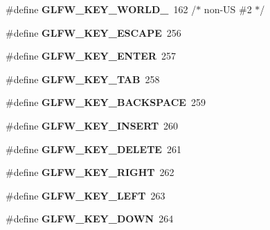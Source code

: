 \begin{DoxyCompactItemize}
\item 
\mbox{\label{group__keys_ga20494bfebf0bb4fc9503afca18ab2c5e}} 
\#define {\bfseries G\+L\+F\+W\+\_\+\+K\+E\+Y\+\_\+\+W\+O\+R\+L\+D\+\_}~162 /$\ast$ non-\/US \#2 $\ast$/
\item 
\mbox{\label{group__keys_gaac6596c350b635c245113b81c2123b93}} 
\#define {\bfseries G\+L\+F\+W\+\_\+\+K\+E\+Y\+\_\+\+E\+S\+C\+A\+PE}~256
\item 
\mbox{\label{group__keys_ga9555a92ecbecdbc1f3435219c571d667}} 
\#define {\bfseries G\+L\+F\+W\+\_\+\+K\+E\+Y\+\_\+\+E\+N\+T\+ER}~257
\item 
\mbox{\label{group__keys_ga6908a4bda9950a3e2b73f794bbe985df}} 
\#define {\bfseries G\+L\+F\+W\+\_\+\+K\+E\+Y\+\_\+\+T\+AB}~258
\item 
\mbox{\label{group__keys_ga6c0df1fe2f156bbd5a98c66d76ff3635}} 
\#define {\bfseries G\+L\+F\+W\+\_\+\+K\+E\+Y\+\_\+\+B\+A\+C\+K\+S\+P\+A\+CE}~259
\item 
\mbox{\label{group__keys_ga373ac7365435d6b0eb1068f470e34f47}} 
\#define {\bfseries G\+L\+F\+W\+\_\+\+K\+E\+Y\+\_\+\+I\+N\+S\+E\+RT}~260
\item 
\mbox{\label{group__keys_gadb111e4df74b8a715f2c05dad58d2682}} 
\#define {\bfseries G\+L\+F\+W\+\_\+\+K\+E\+Y\+\_\+\+D\+E\+L\+E\+TE}~261
\item 
\mbox{\label{group__keys_ga06ba07662e8c291a4a84535379ffc7ac}} 
\#define {\bfseries G\+L\+F\+W\+\_\+\+K\+E\+Y\+\_\+\+R\+I\+G\+HT}~262
\item 
\mbox{\label{group__keys_gae12a010d33c309a67ab9460c51eb2462}} 
\#define {\bfseries G\+L\+F\+W\+\_\+\+K\+E\+Y\+\_\+\+L\+E\+FT}~263
\item 
\mbox{\label{group__keys_gae2e3958c71595607416aa7bf082be2f9}} 
\#define {\bfseries G\+L\+F\+W\+\_\+\+K\+E\+Y\+\_\+\+D\+O\+WN}~264
\item 
\mbox{\label{group__keys_ga2f3342b194020d3544c67e3506b6f144}} 

\end{DoxyCompactItemize}
